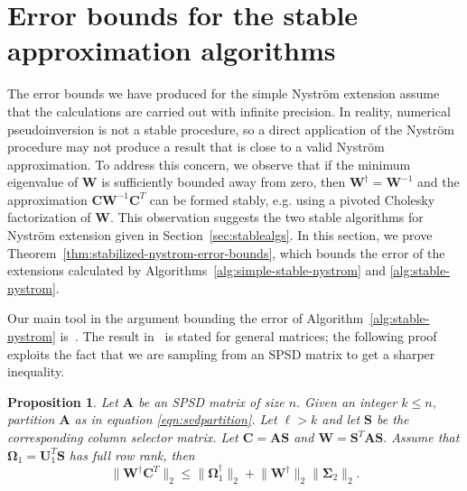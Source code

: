 \documentclass[11pt,letterpaper,twoside,reqno,nosumlimits]{amsart}
\def\pinv{\dagger}
\def\transp{T}
\newcommand{\mat}[1]{\ensuremath{\mathbf{#1}}}
\newcommand{\snorm}[1]{\ensuremath{\big\|#1\big\|_2}}
\newtheorem{prop}{Proposition}
\theoremstyle{remark}
\begin{document}
\section{Error bounds for the stable approximation algorithms}

The error bounds we have produced for the simple Nystr\"om extension assume that the calculations are carried out with infinite precision. In reality, numerical pseudoinversion is not a stable procedure, so a direct application of the Nystr\"om procedure may not produce a result that is close to a valid Nystr\"om approximation. To address this concern, we observe that if the minimum eigenvalue of $\mat{W}$ is sufficiently bounded away from zero, then $\mat{W}^\pinv = \mat{W}^{-1}$ and the approximation $\mat{C} \mat{W}^{-1} \mat{C}^\transp$ can be formed stably, e.g. using a pivoted Cholesky factorization of $\mat{W}.$ This observation suggests the two stable algorithms for Nystr\"om extension given in Section~\ref{sec:stablealgs}. In this section, we prove Theorem~\ref{thm:stabilized-nystrom-error-bounds}, which bounds the error of the extensions calculated by Algorithms~\ref{alg:simple-stable-nystrom} and \ref{alg:stable-nystrom}.

Our main tool in the argument bounding the error of Algorithm~\ref{alg:stable-nystrom} is~\cite[Lemma 2.2]{CD11}. The result in~\cite[Lemma 2.2]{CD11} is stated for general matrices; the following proof exploits the fact that we are sampling from an SPSD matrix to get a sharper inequality.
\begin{prop}
 \label{prop:psd-subsampling-principle}
 Let $\mat{A}$ be an SPSD matrix of size $n.$ Given an integer $k \leq n,$ partition $\mat{A}$ as in equation \eqref{eqn:svdpartition}. Let $\ell > k$ and let $\mat{S}$ be the corresponding column selector matrix. Let $\mat{C} = \mat{A} \mat{S}$ and $\mat{W} = \mat{S}^\transp \mat{A} \mat{S}.$ Assume that $\mat{\Omega}_1 = \mat{U}_1^\transp \mat{S}$ has full row rank, then
\[
 \snorm{\mat{W}^\pinv \mat{C}^\transp} \leq \snorm{\mat{\Omega}_1^\pinv} + \snorm{\mat{W}^\pinv} \snorm{\mat{\Sigma}_2}.
\]

\end{prop}
\end{document}
